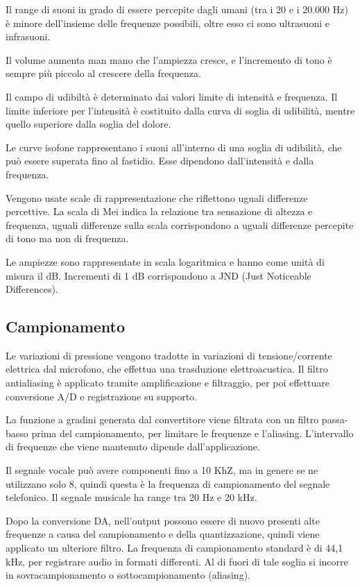 Il range di suoni in grado di essere percepite dagli umani (tra i 20 e i 20.000 Hz) è minore dell'insieme delle frequenze possibili, oltre esso ci sono ultrasuoni e infrasuoni. 

Il volume aumenta man mano che l'ampiezza cresce, e l'incremento di tono è sempre più piccolo al crescere della frequenza.

Il campo di udibiltà è determinato dai valori limite di intensità e frequenza. Il limite inferiore per l'intensità è costituito dalla curva di soglia di udibilità, mentre quello superiore dalla soglia del dolore. 

Le curve isofone rappresentano i suoni all'interno di una soglia di udibilità, che può essere superata fino al fastidio. Esse dipendono dall'intensità e dalla frequenza.

Vengono usate scale di rappresentazione che riflettono uguali differenze percettive. La scala di Mei indica la relazione tra sensazione di altezza e frequenza, uguali differenze sulla scala corrispondono a uguali differenze percepite di tono ma non di frequenza.

Le ampiezze sono rappresentate in scala logaritmica e hanno come unità di misura il dB. Incrementi di 1 dB corrispondono a JND (Just Noticeable Differences).

\subsection{Campionamento}
Le variazioni di pressione vengono tradotte in variazioni di tensione/corrente elettrica dal microfono, che effettua una trasduzione elettroacustica. Il filtro antialiasing è applicato tramite amplificazione e filtraggio, per poi effettuare conversione A/D e registrazione su supporto.

La funzione a gradini generata dal convertitore viene filtrata con un filtro passa-basso prima del campionamento, per limitare le frequenze e l'aliasing. L'intervallo di frequenze che viene mantenuto dipende dall'applicazione.

Il segnale vocale può avere componenti fino a 10 KhZ, ma in genere se ne utilizzano solo 8, quindi questa è la frequenza di campionamento del segnale telefonico. Il segnale musicale ha range tra 20 Hz e 20 kHz.

Dopo la conversione DA, nell'output possono essere di nuovo presenti alte frequenze a causa del campionamento e della quantizzazione, quindi viene applicato un ulteriore filtro. La frequenza di campionamento standard è di 44,1 kHz, per registrare audio in formati differenti. Al di fuori di tale soglia si incorre in sovracampionamento o sottocampionamento (aliasing). 

